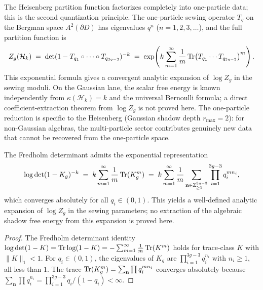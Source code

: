 \begin{remark}
\label{rem:thqg-I-one-particle}
The Heisenberg partition function factorizes completely into one-particle data; this is the second quantization principle. The one-particle sewing operator $T_q$ on the Bergman space $A^2(\partial D)$ has eigenvalues $q^n$ ($n = 1, 2, 3, \ldots$), and the full partition function is
\[
Z_g(\mathcal{H}_k) \;=\; \det(1 - T_{q_1} \circ \cdots \circ T_{q_{3g-3}})^{-k} \;=\; \exp\!\left( k \sum_{m=1}^{\infty} \frac{1}{m} \operatorname{Tr}\bigl(T_{q_1} \cdots T_{q_{3g-3}}\bigr)^m \right).
\]
This exponential formula gives a convergent analytic expansion of
$\log Z_g$ in the sewing moduli. On the Gaussian lane, the scalar
free energy is known independently from
$\kappa(\mathcal{H}_k)=k$ and the universal Bernoulli formula; a
direct coefficient-extraction theorem from $\log Z_g$ is not proved
here. The one-particle reduction is specific to the Heisenberg
(Gaussian shadow depth $r_{\max} = 2$): for non-Gaussian algebras, the
multi-particle sector contributes genuinely new data that cannot be
recovered from the one-particle space.
\end{remark}

\begin{proposition}
\label{prop:thqg-I-exponential-rep}
The Fredholm determinant admits the exponential representation
\begin{equation}\label{eq:thqg-I-exponential-fredholm}
\log \det(1 - K_g)^{-k} \;=\; k \sum_{m=1}^\infty \frac{1}{m} \operatorname{Tr}(K_g^m) \;=\; k \sum_{m=1}^\infty \frac{1}{m} \sum_{\mathbf{n} \in \mathbb{Z}_{\geq 1}^{3g-3}} \prod_{i=1}^{3g-3} q_i^{m n_i},
\end{equation}
which converges absolutely for all $q_i \in (0,1)$. This yields a
well-defined analytic expansion of $\log Z_g$ in the sewing
parameters; no extraction of the algebraic shadow free energy from
this expansion is proved here.
\end{proposition}

\begin{proof}
The Fredholm determinant identity $\log\det(1 - K) = \operatorname{Tr}\log(1 - K) = -\sum_{m=1}^\infty \frac{1}{m}\operatorname{Tr}(K^m)$ holds for trace-class $K$ with $\|K\|_1 < 1$. For $q_i \in (0,1)$, the eigenvalues of $K_g$ are $\prod_{i=1}^{3g-3} q_i^{n_i}$ with $n_i \geq 1$, all less than $1$. The trace $\operatorname{Tr}(K_g^m) = \sum_{\mathbf{n}} \prod q_i^{mn_i}$ converges absolutely because $\sum_{\mathbf{n}} \prod q_i^{n_i} = \prod_{i=1}^{3g-3} q_i/(1-q_i) < \infty$.
\end{proof}

